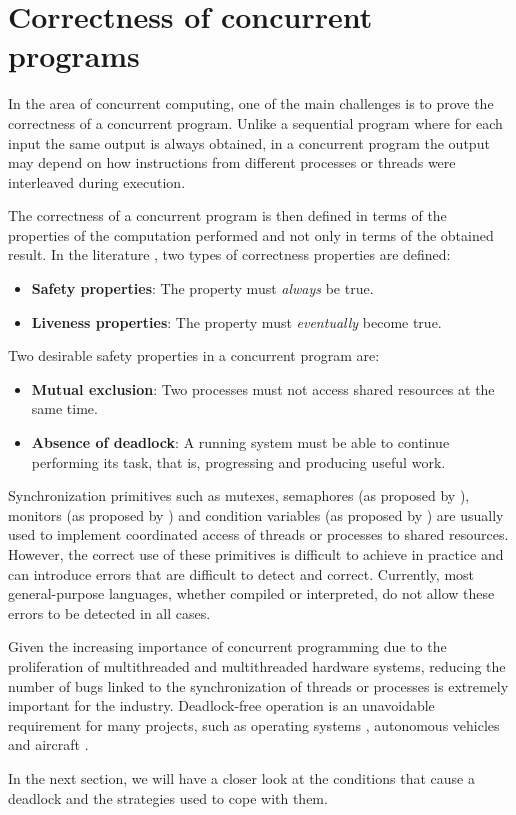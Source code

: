 \documentclass[../Thesis.tex]{subfiles}
\begin{document}
\section{Correctness of concurrent programs}

In the area of concurrent computing, one of the main challenges is
to prove the correctness of a concurrent program.
Unlike a sequential program where for each input the same output
is always obtained, in a concurrent program the output may depend
on how instructions from different processes or
threads were interleaved during execution.

The correctness of a concurrent program is then defined
in terms of the properties of the computation performed
and not only in terms of the obtained result.
In the literature \cite{ben-ari2006,coulouris2012,tanenbaum2017},
two types of correctness properties are defined:

\begin{itemize}
  \item \textbf{Safety properties}: The property must \emph{always} be true.
  \item \textbf{Liveness properties}: The property must \emph{eventually} become true.

\end{itemize}

Two desirable safety properties in a concurrent program are:

\begin{itemize}
  \item \textbf{Mutual exclusion}: Two processes must not access shared resources at the same time.
  \item \textbf{Absence of deadlock}: A running system must be able to continue performing its task,
        that is, progressing and producing useful work.
\end{itemize}

Synchronization primitives such as mutexes,
semaphores (as proposed by \cite{Dijkstra2002}),
monitors (as proposed by \cite{hansen1972structured,hansen1973operating})
and condition variables (as proposed by \cite{hoare1974monitors}) are usually used
to implement coordinated access of threads or processes to shared resources.
However, the correct use of these primitives is difficult to achieve in practice
and can introduce errors that are difficult to detect and correct.
Currently, most general-purpose languages, whether compiled or interpreted,
do not allow these errors to be detected in all cases.

Given the increasing importance of concurrent programming due to the proliferation
of multithreaded and multithreaded hardware systems,
reducing the number of bugs linked to the synchronization of threads or processes
is extremely important for the industry.
Deadlock-free operation is an unavoidable requirement for many projects, such as
operating systems \cite{ArpaciDusseau2018}, autonomous vehicles \cite{Perronnet2019}
and aircraft \cite{carreno2005safety,monzon2009deadlock}.

In the next section, we will have a closer look at the conditions that cause a deadlock
and the strategies used to cope with them.
\end{document}
